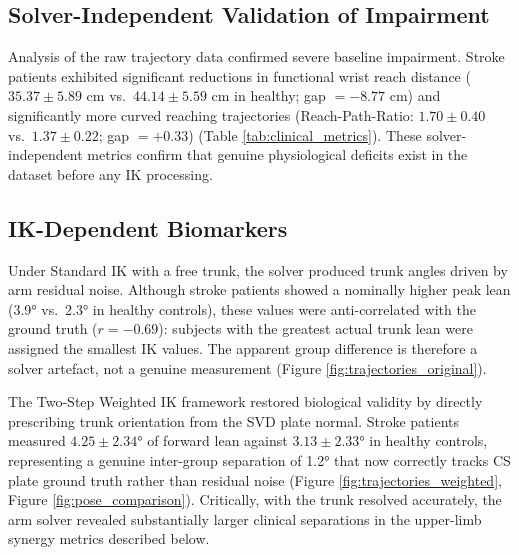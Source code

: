 \documentclass[12pt, a4paper]{elsarticle}
\begin{document}
\begin{table}[htbp]
  \centering
  \caption{IK Reconstruction Error (Mean $\pm$ SD per subject).}
  \label{tab:reconstruction_error}
  \vspace{0.5em}
\end{table}

\subsection{Solver-Independent Validation of Impairment}
Analysis of the raw trajectory data confirmed severe baseline impairment. Stroke patients exhibited significant reductions in functional wrist reach distance ($35.37 \pm 5.89$ cm vs.\ $44.14 \pm 5.59$ cm in healthy; gap $= -8.77$ cm) and significantly more curved reaching trajectories (Reach-Path-Ratio: $1.70 \pm 0.40$ vs.\ $1.37 \pm 0.22$; gap $= +0.33$) (Table \ref{tab:clinical_metrics}). These solver-independent metrics confirm that genuine physiological deficits exist in the dataset before any IK processing.

\subsection{IK-Dependent Biomarkers}
Under Standard IK with a free trunk, the solver produced trunk angles driven by arm residual noise. Although stroke patients showed a nominally higher peak lean (3.9° vs.\ 2.3° in healthy controls), these values were anti-correlated with the ground truth ($r = -0.69$): subjects with the greatest actual trunk lean were assigned the smallest IK values. The apparent group difference is therefore a solver artefact, not a genuine measurement (Figure \ref{fig:trajectories_original}).

The Two-Step Weighted IK framework restored biological validity by directly prescribing trunk orientation from the SVD plate normal. Stroke patients measured $4.25 \pm 2.34$° of forward lean against $3.13 \pm 2.33$° in healthy controls, representing a genuine inter-group separation of 1.2° that now correctly tracks CS plate ground truth rather than residual noise (Figure \ref{fig:trajectories_weighted}, Figure \ref{fig:pose_comparison}). Critically, with the trunk resolved accurately, the arm solver revealed substantially larger clinical separations in the upper-limb synergy metrics described below.
\end{document}
